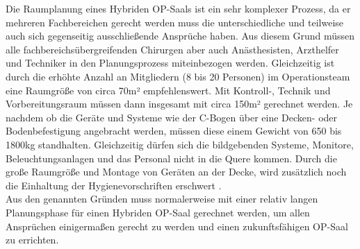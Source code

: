 Die Raumplanung eines Hybriden OP-Saals ist ein sehr komplexer Prozess, da er mehreren Fachbereichen gerecht werden muss die unterschiedliche und teilweise auch sich gegenseitig ausschließende Ansprüche haben. Aus diesem Grund müssen alle fachbereichsübergreifenden Chirurgen aber auch Anästhesisten, Arzthelfer und Techniker in den Planungsprozess miteinbezogen werden.
Gleichzeitig ist durch die erhöhte Anzahl an Mitgliedern (8 bis 20 Personen) im Operationsteam eine Raumgröße von circa 70m² empfehlenswert. Mit Kontroll-, Technik und Vorbereitungsraum müssen dann insgesamt mit circa 150m² gerechnet werden. Je nachdem ob die Geräte und Systeme wie der C-Bogen über eine Decken- oder Bodenbefestigung angebracht werden, müssen diese einem Gewicht von 650 bis 1800kg standhalten. Gleichzeitig dürfen sich die bildgebenden Systeme, Monitore, Beleuchtungsanlagen und das Personal nicht in die Quere kommen. Durch die große Raumgröße und Montage von Geräten an der Decke, wird zusätzlich noch die Einhaltung der Hygienevorschriften erschwert \cite{TechnicalConsiderations}.\\
Aus den genannten Gründen muss normalerweise mit einer relativ langen Planungsphase für einen Hybriden OP-Saal gerechnet werden, um allen Ansprüchen einigermaßen gerecht zu werden und einen zukunftsfähigen OP-Saal zu errichten.



 





